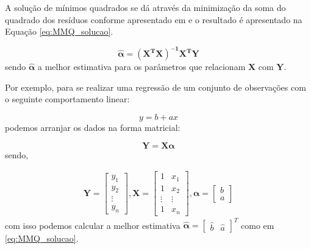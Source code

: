 A solução de mínimos quadrados se dá através da minimização da soma do quadrado dos resíduos conforme apresentado em \cite{wiki:MMQ} e o resultado é apresentado na Equação \ref{eq:MMQ_solucao}.

\begin{equation}
    \bm{\hat{\alpha}} = \bm{\left( X^{T}X \right)^{-1}X^{T}Y}
    \label{eq:MMQ_solucao}
\end{equation}
sendo $\bm{\hat{\alpha}}$ a melhor estimativa para os parâmetros que relacionam $\bm{X}$ com $\bm{Y}$.

Por exemplo, para se realizar uma regressão de um conjunto de observações com o seguinte comportamento linear:

\begin{equation}
    y = b + ax
\end{equation}
podemos arranjar os dados na forma matricial:

\begin{equation*}
    \bm{Y} = \bm{X\alpha}
\end{equation*}
sendo,

\begin{align*}
    \bm{Y} =
    \begin{bmatrix}
        y_1\\
        y_2\\
        \vdots\\
        y_n
    \end{bmatrix},
    \bm{X} = 
    \begin{bmatrix}
        1 & x_1\\
        1 & x_2\\
        \vdots & \vdots\\
        1 & x_n
    \end{bmatrix}, 
    \bm{\alpha} = 
    \begin{bmatrix}
        b\\
        a
    \end{bmatrix}
\end{align*}
com isso podemos calcular a melhor estimativa $\bm{\hat{\alpha}} = \begin{bmatrix}\hat{b} & \hat{a}\end{bmatrix}^T$ como em \ref{eq:MMQ_solucao}.

